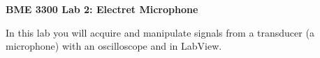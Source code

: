 \documentclass[12pt]{article}
\begin{document}
\thispagestyle{plain} %





\begin{center}
\bigskip

\textbf{BME 3300 Lab 2: Electret Microphone} \medskip

\end{center}

\bigskip

In this lab you will acquire and manipulate signals from a transducer (a microphone) with an oscilloscope and in LabView.
\end{document}
